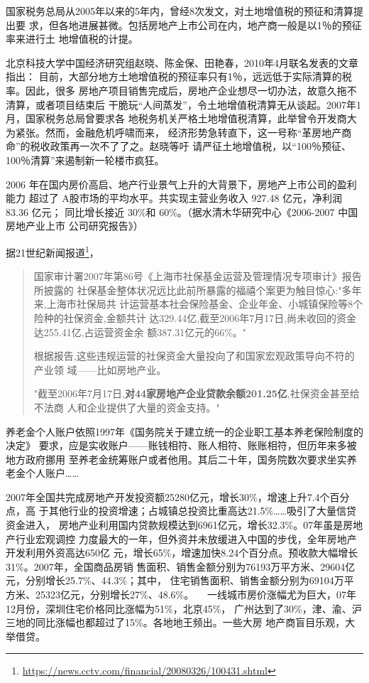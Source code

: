 国家税务总局从2005年以来的5年内，曾经8次发文，对土地增值税的预征和清算提出要
求，但各地进展甚微。包括房地产上市公司在内，地产商一般是以1％的预征率来进行土
地增值税的计提。

北京科技大学中国经济研究组赵晓、陈金保、田艳春，2010年4月联名发表的文章指出：
目前，大部分地方土地增值税的预征率只有1％，远远低于实际清算的税率。因此，很多
房地产项目销售完成后，房地产企业想尽一切办法，故意久拖不清算，或者项目结束后
干脆玩“人间蒸发”，令土地增值税清算无从谈起。2007年1月，国家税务总局曾要求各
地税务机关严格土地增值税清算，此举曾令开发商大为紧张。然而，金融危机呼啸而来，
经济形势急转直下，这一号称“革房地产商命”的税收政策再一次不了了之。赵晓等吁
请严征土地增值税，以“100％预征、100％清算”来遏制新一轮楼市疯狂。

2006 年在国内房价高启、地产行业景气上升的大背景下，房地产上市公司的盈利能力
超过了 A股市场的平均水平。共实现主营业务收入 927.48 亿元，净利润 83.36 亿元；
同比增长接近 30\%和 60\%。（据水清木华研究中心《2006-2007 中国房地产业上市
公司研究报告》）


据21世纪新闻报道\footnote{\url{https://news.cctv.com/financial/20080326/100431.shtml}}，
\begin{quotation}
  国家审计署2007年第86号《上海市社保基金运营及管理情况专项审计》报告所披露的
  社保基金整体状况远比此前所暴露的福禧个案更为触目惊心:"多年来,上海市社保局共
  计运营基本社会保险基金、企业年金、小城镇保险等8个险种的社保资金,金额共计
  达329.44亿,截至2006年7月17日,尚未收回的资金达255.41亿,占运营资金余
  额387.31亿元的66\%。"

  根据报告,这些违规运营的社保资金大量投向了和国家宏观政策导向不符的产业领
  域——比如房地产业。

  "截至2006年7月17日,\textbf{对44家房地产企业贷款余额201.25亿},社保资金甚至给不法商
  人和企业提供了大量的资金支持。"
\end{quotation}
养老金个人账户依照1997年《国务院关于建立统一的企业职工基本养老保险制度的决定》
要求，应是实收账户——账钱相符、账人相符、账账相符，但历年来多被地方政府挪用
至养老金统筹账户或者他用。其后二十年，国务院数次要求坐实养老金个人账户……

2007年全国共完成房地产开发投资额25280亿元，增长30\%，增速上升7.4个百分点，高
于其他行业的投资增速；占城镇总投资比重高达21.5\%……吸引了大量信贷资金进入，
房地产业利用国内贷款规模达到6961亿元，增长32.3\%。07年虽是房地产行业宏观调控
力度最大的一年，但外资并未放缓进入中国的步伐，全年房地产开发利用外资高达650亿
元，增长65\%，增速加快8.24个百分点。预收款大幅增长31\%。2007年，全国商品房销
售面积、销售金额分别为76193万平方米、29604亿元，分别增长25.7\%、44.3\%；其中，
住宅销售面积、销售金额分别为69104万平方米、25323亿元，分别增长27\%、48.6\%。
　一线城市房价涨幅尤为巨大，07年12月份，深圳住宅价格同比涨幅为51\%，北京45\%，
广州达到了30\%，津、渝、沪三地的同比涨幅也都超过了15\%。各地地王频出。一些大房
地产商盲目乐观，大举借贷。

